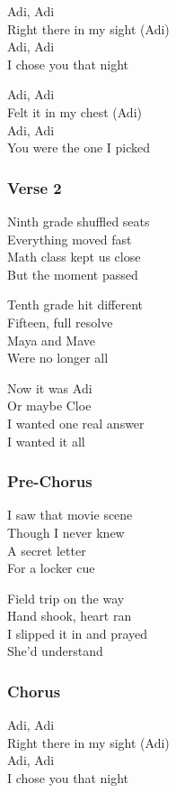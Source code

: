 Adi, Adi\\
Right there in my sight (Adi)\\
Adi, Adi\\
I chose you that night

Adi, Adi\\
Felt it in my chest (Adi)\\
Adi, Adi\\
You were the one I picked

\subsubsection{Verse 2}\label{verse-2-20}

Ninth grade shuffled seats\\
Everything moved fast\\
Math class kept us close\\
But the moment passed

Tenth grade hit different\\
Fifteen, full resolve\\
Maya and Mave\\
Were no longer all

Now it was Adi\\
Or maybe Cloe\\
I wanted one real answer\\
I wanted it all

\subsubsection{Pre-Chorus}\label{pre-chorus-32}

I saw that movie scene\\
Though I never knew\\
A secret letter\\
For a locker cue

Field trip on the way\\
Hand shook, heart ran\\
I slipped it in and prayed\\
She'd understand

\subsubsection{Chorus}\label{chorus-51}

Adi, Adi\\
Right there in my sight (Adi)\\
Adi, Adi\\
I chose you that night

